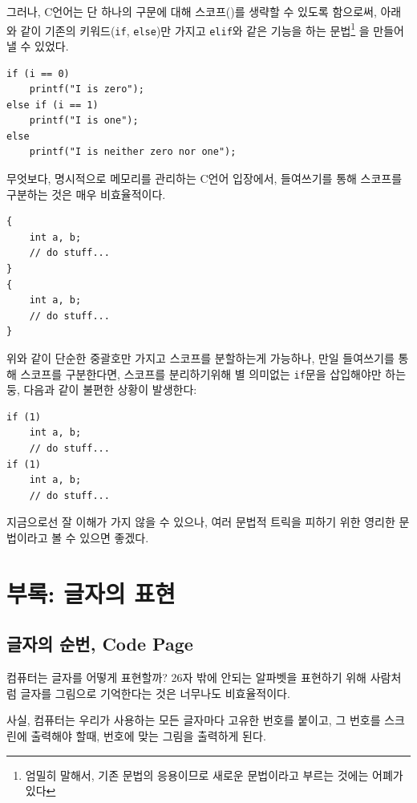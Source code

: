 \documentclass[a4paper,12pt]{book}
\newcommand{\V}[1]{\Verb|#1|}
\begin{document}
\begin{appendices}
그러나, C언어는 단 하나의 구문에 대해 스코프({})를 생략할 수 있도록 함으로써,
아래와 같이 기존의 키워드(\V{if}, \V{else})만 가지고 \V{elif}와 같은 기능을 하는
문법\footnote{엄밀히 말해서, 기존 문법의 응용이므로 새로운 문법이라고 부르는 것에는 어폐가 있다}
을 만들어 낼 수 있었다.

\begin{lstlisting}
if (i == 0)
    printf("I is zero");
else if (i == 1)
    printf("I is one");
else
    printf("I is neither zero nor one");
\end{lstlisting}

무엇보다, 명시적으로 메모리를 관리하는 C언어 입장에서,
들여쓰기를 통해 스코프를 구분하는 것은 매우 비효율적이다.

\begin{lstlisting}
{
    int a, b;
    // do stuff...
}
{
    int a, b;
    // do stuff...
}
\end{lstlisting}

위와 같이 단순한 중괄호만 가지고 스코프를 분할하는게 가능하나,
만일 들여쓰기를 통해 스코프를 구분한다면,
스코프를 분리하기위해 별 의미없는 \V{if}문을 삽입해야만 하는 둥,
다음과 같이 불편한 상황이 발생한다:

\begin{lstlisting}
if (1)
    int a, b;
    // do stuff...
if (1)
    int a, b;
    // do stuff...
\end{lstlisting}

지금으로선 잘 이해가 가지 않을 수 있으나,
여러 문법적 트릭을 피하기 위한 영리한 문법이라고 볼 수 있으면 좋겠다.


\chapter{부록: 글자의 표현}


\section{글자의 순번, Code Page}
\label{sec:unicode}

컴퓨터는 글자를 어떻게 표현할까?
26자 밖에 안되는 알파벳을 표현하기 위해 사람처럼 글자를 그림으로 기억한다는 것은 너무나도 비효율적이다.

사실, 컴퓨터는 우리가 사용하는 모든 글자마다 고유한 번호를 붙이고,
그 번호를 스크린에 출력해야 할때,
번호에 맞는 그림을 출력하게 된다.


\end{appendices}
\end{document}
